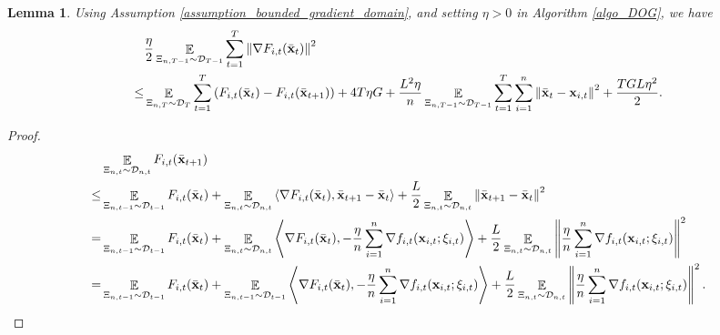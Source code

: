 \documentclass{article}
\newtheorem{Lemma}{\bf{Lemma}}
\begin{document}
\begin{Lemma}
\label{lemma_gradient_norm_bound}
Using Assumption \ref{assumption_bounded_gradient_domain}, and setting $\eta>0$ in Algorithm \ref{algo_DOG}, we have 
\begin{align}
& \frac{\eta}{2} \mathop{\mathbb{E}}_{ \Xi_{n,T-1} \sim \mathcal{D}_{T-1} }\sum_{t=1}^T \left\lVert\nabla F_{i,t}(\bar{{\bf x}}_t)\right\rVert^2 \\ \nonumber
\le & \mathop{\mathbb{E}}_{ \Xi_{n,T} \sim \mathcal{D}_{T} } \sum_{t=1}^T  \left( F_{i,t}(\bar{{\bf x}}_t) - F_{i,t}(\bar{{\bf x}}_{t+1}) \right) + 4T  \eta G + \frac{ L^2 \eta}{n}\mathop{\mathbb{E}}_{ \Xi_{n,T-1} \sim \mathcal{D}_{T-1} }\sum_{t=1}^T\sum_{i=1}^n \left\lVert \bar{{\bf x}}_t - {\bf x}_{i,t} \right\rVert^2 + \frac{TGL\eta^2}{2}.
\end{align}
\end{Lemma}
\begin{proof}

\begin{align}
\nonumber
& \mathop{\mathbb{E}}_{ \Xi_{n,t} \sim \mathcal{D}_{n,t} } F_{i,t}(\bar{{\bf x}}_{t+1}) \\ \nonumber
\le & \mathop{\mathbb{E}}_{ \Xi_{n,t-1} \sim \mathcal{D}_{t-1} } F_{i,t}(\bar{{\bf x}}_t) + \mathop{\mathbb{E}}_{ \Xi_{n,t} \sim \mathcal{D}_{n,t} }\left\langle\nabla F_{i,t}(\bar{{\bf x}}_t), \bar{{\bf x}}_{t+1} - \bar{{\bf x}}_t \right\rangle + \frac{L}{2}\mathop{\mathbb{E}}_{ \Xi_{n,t} \sim \mathcal{D}_{n,t} }\left\lVert\bar{{\bf x}}_{t+1} - \bar{{\bf x}}_t\right\rVert^2 \\ \nonumber
= & \mathop{\mathbb{E}}_{ \Xi_{n,t-1} \sim \mathcal{D}_{t-1} } F_{i,t}(\bar{{\bf x}}_t) + \mathop{\mathbb{E}}_{ \Xi_{n,t} \sim \mathcal{D}_{n,t} }\left\langle\nabla F_{i,t}(\bar{{\bf x}}_t), -\frac{\eta}{n}\sum_{i=1}^n \nabla f_{i,t}({\bf x}_{i,t};\xi_{i,t}) \right\rangle + \frac{L}{2} \mathop{\mathbb{E}}_{ \Xi_{n,t} \sim \mathcal{D}_{n,t} }\left\lVert\frac{\eta}{n}\sum_{i=1}^n \nabla f_{i,t}({\bf x}_{i,t};\xi_{i,t})\right\rVert^2 \\ \label{equa_lemma_gradient_norm_temp0}
= & \mathop{\mathbb{E}}_{ \Xi_{n,t-1} \sim \mathcal{D}_{t-1} } F_{i,t}(\bar{{\bf x}}_t) + \mathop{\mathbb{E}}_{ \Xi_{n,t-1} \sim \mathcal{D}_{t-1} }\left\langle\nabla F_{i,t}(\bar{{\bf x}}_t), -\frac{\eta}{n}\sum_{i=1}^n \nabla f_{i,t}({\bf x}_{i,t};\xi_{i,t}) \right\rangle + \frac{L}{2} \mathop{\mathbb{E}}_{ \Xi_{n,t} \sim \mathcal{D}_{n,t} }\left\lVert\frac{\eta}{n}\sum_{i=1}^n \nabla f_{i,t}({\bf x}_{i,t};\xi_{i,t})\right\rVert^2.
\end{align}



\end{proof}
\end{document}
